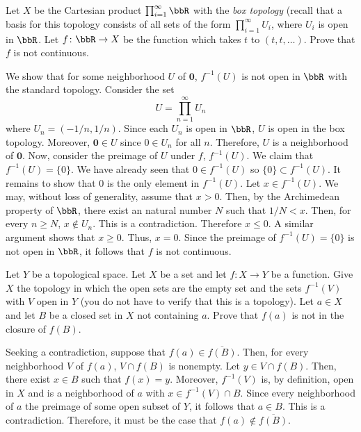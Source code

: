 \begin{problem}
  Let \(X\) be the Cartesian product \(\prod_{i=1}^\infty\bbR\) with the
  \emph{box topology} (recall that a basis for this topology consists of
  all sets of the form \(\prod_{i=1}^\infty U_i\), where \(U_i\) is open in
  \(\bbR\). Let \(f\colon\bbR\to X\) be the function which takes \(t\) to
  \((t,t,\ldots)\). Prove that \(f\) is not continuous.
\end{problem}
\begin{solution}
  We show that for some neighborhood \(U\) of \(\mathbf{0}\), \(f^{-1}(U)\)
  is not open in \(\bbR\) with the standard topology. Consider the set
  \[
    U=\prod_{n=1}^\infty U_n
  \]
  where \(U_n=(-1/n,1/n)\). Since each \(U_n\) is open in \(\bbR\), \(U\)
  is open in the box topology. Moreover, \(\mathbf{0}\in U\) since
  \(0\in U_n\) for all \(n\). Therefore, \(U\) is a neighborhood of
  \(\mathbf{0}\). Now, consider the preimage of \(U\) under \(f\),
  \(f^{-1}(U)\). We claim that \(f^{-1}(U)=\{0\}\). We have already seen
  that \(0\in f^{-1}(U)\) so \(\{0\}\subset f^{-1}(U)\). It remains to
  show that \(0\) is the only element in \(f^{-1}(U)\). Let
  \(x\in f^{-1}(U)\). We may, without loss of generality, assume that
  \(x>0\). Then, by the Archimedean property of \(\bbR\), there exist an
  natural number \(N\) such that \(1/N<x\). Then, for every \(n\geq N\),
  \(x\notin U_n\). This is a contradiction. Therefore \(x\leq 0\). A
  similar argument shows that \(x\geq 0\). Thus, \(x=0\). Since the
  preimage of \(f^{-1}(U)=\{0\}\) is not open in \(\bbR\), it follows that
  \(f\) is not continuous.
\end{solution}

\begin{problem}
  Let \(Y\) be a topological space. Let \(X\) be a set and let
  \(f\colon X\to Y\) be a function. Give \(X\) the topology in which the
  open sets are the empty set and the sets \(f^{-1}(V)\) with \(V\) open in
  \(Y\) (you do not have to verify that this is a topology). Let \(a\in X\)
  and let \(B\) be a closed set in \(X\) not containing \(a\). Prove that
  \(f(a)\) is not in the closure of \(f(B)\).
\end{problem}
\begin{solution}
  Seeking a contradiction, suppose that \(f(a)\in\overline{f(B)}\). Then,
  for every neighborhood \(V\) of \(f(a)\), \(V\cap f(B)\) is nonempty. Let
  \(y\in V\cap f(B)\). Then, there exist \(x\in B\) such that
  \(f(x)=y\). Moreover, \(f^{-1}(V)\) is, by definition, open in \(X\) and
  is a neighborhood of \(a\) with \(x\in f^{-1}(V)\cap B\). Since every
  neighborhood of \(a\) the preimage of some open subset of \(Y\), it
  follows that \(a\in B\). This is a contradiction. Therefore, it must be
  the case that \(f(a)\notin\overline{f(B)}\).
\end{solution}

